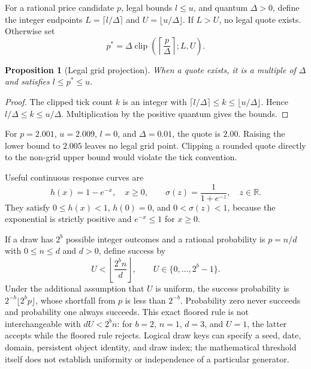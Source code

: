 \documentclass[11pt,a4paper]{article}
\newtheorem{proposition}[theorem]{Proposition}
\begin{document}
For a rational price candidate $p$, legal bounds $l\leq u$, and quantum $\Delta>0$, define the integer endpoints $L=\lceil l/\Delta\rceil$ and $U=\lfloor u/\Delta\rfloor$. If $L>U$, no legal quote exists. Otherwise set
\begin{equation}
p^*=\Delta\operatorname{clip}\left(\left\lceil\frac p\Delta\right\rceil;L,U\right).
\end{equation}

\begin{proposition}[Legal grid projection]
When a quote exists, it is a multiple of $\Delta$ and satisfies $l\leq p^*\leq u$.
\end{proposition}
\begin{proof}
The clipped tick count $k$ is an integer with $\lceil l/\Delta\rceil\leq k\leq\lfloor u/\Delta\rfloor$. Hence $l/\Delta\leq k\leq u/\Delta$. Multiplication by the positive quantum gives the bounds.
\end{proof}

For $p=2.001$, $u=2.009$, $l=0$, and $\Delta=0.01$, the quote is $2.00$. Raising the lower bound to $2.005$ leaves no legal grid point. Clipping a rounded quote directly to the non-grid upper bound would violate the tick convention.

Useful continuous response curves are
\begin{equation}
h(x)=1-e^{-x},\quad x\geq0,\qquad
\sigma(z)=\frac1{1+e^{-z}},\quad z\in\mathbb R.
\end{equation}
They satisfy $0\leq h(x)<1$, $h(0)=0$, and $0<\sigma(z)<1$, because the exponential is strictly positive and $e^{-x}\leq1$ for $x\geq0$.

If a draw has $2^b$ possible integer outcomes and a rational probability is $p=n/d$ with $0\leq n\leq d$ and $d>0$, define success by
\begin{equation}
U<\left\lfloor\frac{2^bn}{d}\right\rfloor,
\qquad U\in\{0,\ldots,2^b-1\}.
\end{equation}
Under the additional assumption that $U$ is uniform, the success probability is $2^{-b}\lfloor2^bp\rfloor$, whose shortfall from $p$ is less than $2^{-b}$. Probability zero never succeeds and probability one always succeeds. This exact floored rule is not interchangeable with $dU<2^bn$: for $b=2$, $n=1$, $d=3$, and $U=1$, the latter accepts while the floored rule rejects. Logical draw keys can specify a seed, date, domain, persistent object identity, and draw index; the mathematical threshold itself does not establish uniformity or independence of a particular generator.
\end{document}
